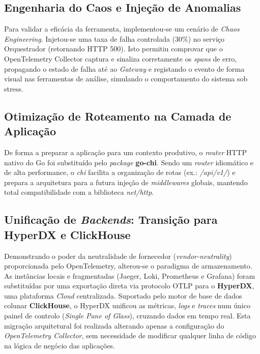 \documentclass[a4paper,12pt,oneside]{article}
\begin{document}
\subsection{Engenharia do Caos e Injeção de Anomalias}
Para validar a eficácia da ferramenta, implementou-se um cenário de \textit{Chaos Engineering}. Injetou-se uma taxa de falha controlada (30\%) no serviço Orquestrador (retornando HTTP 500). Isto permitiu comprovar que o OpenTelemetry Collector captura e sinaliza corretamente os \textit{spans} de erro, propagando o estado de falha até ao \textit{Gateway} e registando o evento de forma visual nas ferramentas de análise, simulando o comportamento do sistema sob stress.

\subsection{Otimização de Roteamento na Camada de Aplicação}
De forma a preparar a aplicação para um contexto produtivo, o \textit{router} HTTP nativo do Go foi substituído pelo \textit{package} \textbf{go-chi}. Sendo um \textit{router} idiomático e de alta performance, o \textit{chi} facilita a organização de rotas (ex.: \textit{/api/v1/}) e prepara a arquitetura para a futura injeção de \textit{middlewares} globais, mantendo total compatibilidade com a biblioteca \textit{net/http}.

\subsection{Unificação de \textit{Backends}: Transição para HyperDX e ClickHouse}
Demonstrando o poder da neutralidade de fornecedor (\textit{vendor-neutrality}) proporcionada pelo OpenTelemetry, alterou-se o paradigma de armazenamento. As instâncias locais e fragmentadas (Jaeger, Loki, Prometheus e Grafana) foram substituídas por uma exportação direta via protocolo OTLP para o \textbf{HyperDX}, uma plataforma \textit{Cloud} centralizada.
Suportado pelo motor de base de dados colunar \textbf{ClickHouse}, o HyperDX unificou as métricas, \textit{logs} e \textit{traces} num único painel de controlo (\textit{Single Pane of Glass}), cruzando dados em tempo real. Esta migração arquitetural foi realizada alterando apenas a configuração do \textit{OpenTelemetry Collector}, sem necessidade de modificar qualquer linha de código na lógica de negócio das aplicações.
\end{document}
